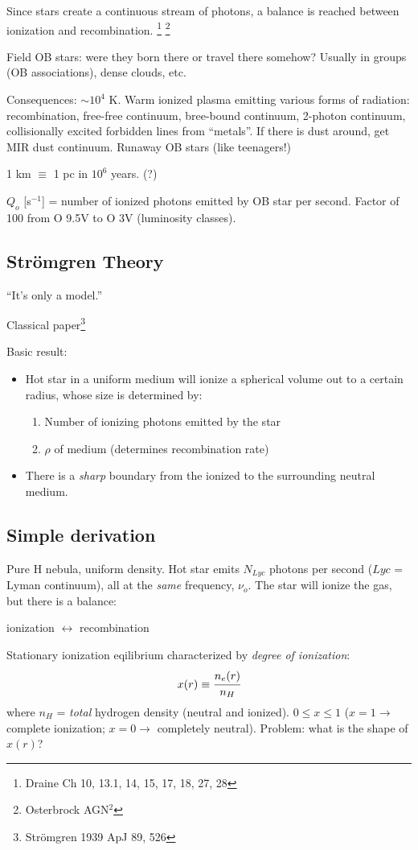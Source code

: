 \documentclass[12pt]{article}
\newcommand{\mar}[1]{\hspace{0pt}\marginpar{-\textcolor{black}{#1}-}}
\begin{document}
\textcolor{bred}{Since stars create a continuous stream of photons, a
balance is reached between ionization and recombination.}
\footnote{Draine Ch 10, 13.1, 14, 15, 17, 18, 27, 28}
\footnote{Osterbrock AGN$^{2}$}

Field OB stars: were they born there or travel there somehow? Usually in
groups (OB associations), dense clouds, etc.

Consequences: $\sim 10^{4}$ K. Warm ionized plasma emitting various forms
of radiation: recombination, free-free continuum, bree-bound continuum,
2-photon continuum, collisionally excited forbidden lines from ``metals''.
If there is dust around, get MIR dust continuum. Runaway OB stars (like
teenagers!)

1 km $\equiv$ 1 pc in $10^{6}$ years. (?)

$Q_{o}$ [s$^{-1}$]
= number of ionized photons emitted by OB star per second.
Factor of 100 from O 9.5V to O 3V (luminosity classes).

\mar{52}
\subsection{Str\"{o}mgren Theory}
``It's only a model.''

Classical paper\footnote{Str\"{o}mgren 1939 ApJ 89, 526}

Basic result:
\begin{itemize}
    \item Hot star in a uniform medium will ionize a spherical volume
        out to a certain radius, whose size is determined by:
        \begin{enumerate}
            \item Number of ionizing photons emitted by the star
            \item $\rho$ of medium (determines recombination rate)
        \end{enumerate}
    \item There is a \emph{sharp} boundary from the ionized to the
        surrounding neutral medium.
\end{itemize}
\subsection{Simple derivation}
Pure H nebula, uniform density. Hot star emits $N_{Lyc}$ photons per
second ($Lyc$ = Lyman continuum), all at the \emph{same} frequency, $\nu_{o}$.
The star will ionize the gas, but there is a balance:
\begin{center}
    \vspace{-2ex}\textcolor{bred}{ionization $\longleftrightarrow$ recombination}\vspace{-2ex}
\end{center}
Stationary ionization eqilibrium characterized by \textit{degree of ionization}:$${
x(r) \equiv \cfrac{n_{e}(r)}{n_{H}}
}$$where $n_{H}$ = \emph{total}
hydrogen density (neutral and ionized).
$0 \le x \le 1$ ($x = 1 \rightarrow$ complete ionization; $x = 0
\rightarrow$ completely neutral). Problem: what is the shape of $x(r)$?
\end{document}
